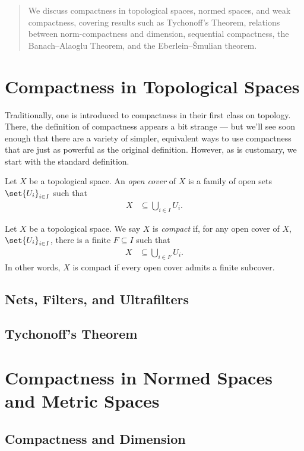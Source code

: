 \documentclass[10pt]{mypackage}
\begin{document}
\RaggedRight
\begin{abstract}
  \noindent We discuss compactness in topological spaces, normed spaces, and weak compactness, covering results such as Tychonoff's Theorem, relations between norm-compactness and dimension, sequential compactness, the Banach--Alaoglu Theorem, and the Eberlein--\v{S}mulian theorem.
\end{abstract}
\section{Compactness in Topological Spaces}%
Traditionally, one is introduced to compactness in their first class on topology. There, the definition of compactness appears a bit strange --- but we'll see soon enough that there are a variety of simpler, equivalent ways to use compactness that are just as powerful as the original definition. However, as is customary, we start with the standard definition.
\begin{definition}
  Let $X$ be a topological space. An \textit{open cover} of $X$ is a family of open sets $\set{U_i}_{i\in I}$ such that
  \begin{align*}
    X &\subseteq \bigcup_{i\in I}U_i.
  \end{align*}
\end{definition}
\begin{definition}
  Let $X$ be a topological space. We say $X$ is \textit{compact} if, for any open cover of $X$, $\set{U_i}_{i\in I}$, there is a finite $F\subseteq I$ such that
  \begin{align*}
    X &\subseteq \bigcup_{i\in F}U_i.
  \end{align*}
  In other words, $X$ is compact if every open cover admits a finite subcover.
\end{definition}
\subsection{Nets, Filters, and Ultrafilters}%
\subsection{Tychonoff's Theorem}%
\section{Compactness in Normed Spaces and Metric Spaces}%
\subsection{Compactness and Dimension}%
\end{document}
